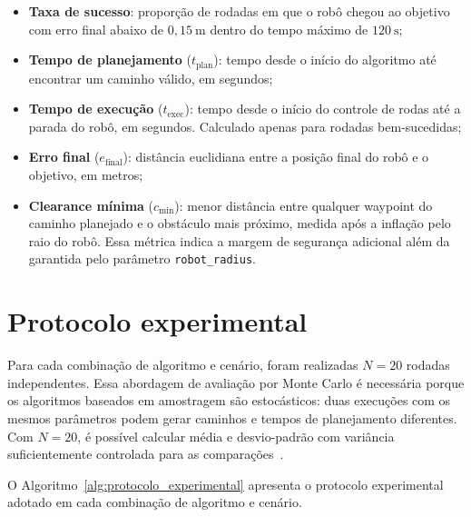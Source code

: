 \begin{itemize}
    \item \textbf{Taxa de sucesso}: proporção de rodadas em que o robô chegou ao objetivo com erro final abaixo de $0{,}15~\text{m}$ dentro do tempo máximo de $120~\text{s}$;

    \item \textbf{Tempo de planejamento} ($t_{\text{plan}}$): tempo desde o início do algoritmo até encontrar um caminho válido, em segundos;

    \item \textbf{Tempo de execução} ($t_{\text{exec}}$): tempo desde o início do controle de rodas até a parada do robô, em segundos. Calculado apenas para rodadas bem-sucedidas;

    \item \textbf{Erro final} ($e_{\text{final}}$): distância euclidiana entre a posição final do robô e o objetivo, em metros;

    \item \textbf{Clearance mínima} ($c_{\text{min}}$): menor distância entre qualquer waypoint do caminho planejado e o obstáculo mais próximo, medida após a inflação pelo raio do robô. Essa métrica indica a margem de segurança adicional além da garantida pelo parâmetro \texttt{robot\_radius}.
\end{itemize}

\section{Protocolo experimental}
\label{sec:protocolo_experimental}

Para cada combinação de algoritmo e cenário, foram realizadas $N = 20$ rodadas independentes. Essa abordagem de avaliação por Monte Carlo é necessária porque os algoritmos baseados em amostragem são estocásticos: duas execuções com os mesmos parâmetros podem gerar caminhos e tempos de planejamento diferentes. Com $N = 20$, é possível calcular média e desvio-padrão com variância suficientemente controlada para as comparações~\cite{lavalle2006planning}.

O Algoritmo~\ref{alg:protocolo_experimental} apresenta o protocolo experimental adotado em cada combinação de algoritmo e cenário.

